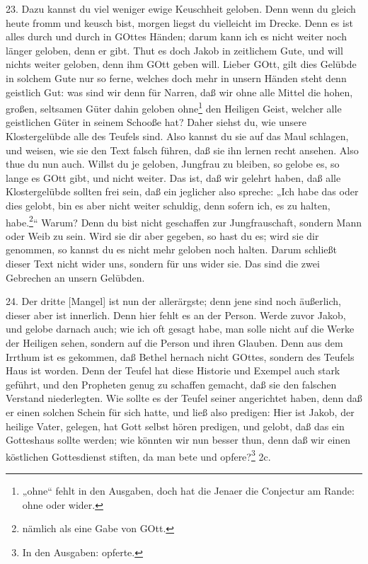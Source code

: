 23. Dazu kannst du viel weniger ewige Keuschheit geloben. Denn wenn du gleich heute fromm und keusch bist, morgen liegst du vielleicht im Drecke. Denn es ist alles durch und durch in GOttes Händen; darum kann ich es nicht weiter noch länger geloben, denn er gibt. Thut es doch Jakob in zeitlichem Gute, und will nichts weiter geloben, denn ihm GOtt geben will. Lieber GOtt, gilt dies Gelübde in solchem Gute nur so ferne, welches doch mehr in unsern Händen steht denn geistlich Gut: was sind wir denn für Narren, daß wir ohne alle Mittel die hohen, großen, seltsamen Güter dahin geloben ohne\footnote{„ohne“ fehlt in den Ausgaben, doch hat die Jenaer die Conjectur am Rande: ohne oder wider.} den Heiligen Geist, welcher alle geistlichen Güter in seinem Schooße hat? Daher siehst du, wie unsere Klostergelübde alle des Teufels sind. Also kannst du sie auf das Maul schlagen, und weisen, wie sie den Text falsch führen, daß sie ihn lernen recht ansehen. Also thue du nun auch. Willst du je geloben, Jungfrau zu bleiben, so gelobe es, so lange es GOtt gibt, und nicht weiter. Das ist, daß wir gelehrt haben, daß alle Klostergelübde sollten frei sein, daß ein jeglicher also spreche: „Ich habe das oder dies gelobt, bin es aber nicht weiter schuldig, denn sofern ich, es zu halten, habe.\footnote{nämlich als eine Gabe von GOtt.}“ Warum? Denn du bist nicht geschaffen zur Jungfrauschaft, sondern Mann oder Weib zu sein. Wird sie dir aber gegeben, so hast du es; wird sie dir genommen, so kannst du es nicht mehr geloben noch halten. Darum schließt dieser Text nicht wider uns, sondern für uns wider sie. Das sind die zwei Gebrechen an unsern Gelübden.

24. Der dritte [Mangel] ist nun der allerärgste; denn jene sind noch äußerlich, dieser aber ist innerlich. Denn hier fehlt es an der Person. Werde zuvor Jakob, und gelobe darnach auch; wie ich oft gesagt habe, man solle nicht auf die Werke der Heiligen sehen, sondern auf die Person und ihren Glauben. Denn aus dem Irrthum ist es gekommen, daß Bethel hernach nicht GOttes, sondern des Teufels Haus ist worden. Denn der Teufel hat diese Historie und Exempel auch stark geführt, und den Propheten genug zu schaffen gemacht, daß sie den falschen Verstand niederlegten. Wie sollte es
der Teufel seiner angerichtet haben, denn daß er einen solchen Schein für sich hatte, und ließ also predigen: Hier ist Jakob, der heilige Vater, gelegen, hat Gott selbst hören predigen, und gelobt, daß das ein Gotteshaus sollte werden; wie könnten wir nun besser thun, denn daß wir einen köstlichen Gottesdienst stiften, da man bete und opfere?\footnote{In den Ausgaben: opferte.} 2c.


